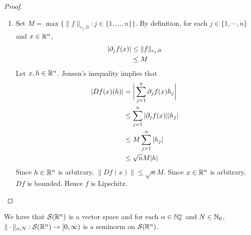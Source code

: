 \documentclass{book}
\begin{document}
	\begin{proof}\
		\begin{enumerate}
			\item Set $M = \max \{\|f\|_{e_j, 0} : j \in \{1, \ldots, n\}\}$. By definition, for each $j \in \{1, \cdots, n\}$ and $x \in \mathbb{R}^n$, 
			\begin{align*}
				| \partial_j f(x)| 
				& \leq \|f\|_{e_j, 0} \\
				& \leq M  
			\end{align*}
			Let $x, h \in \mathbb{R}^n$. Jensen's inequality implies that
			\begin{align*}
				|Df(x)(h)|
				& = \bigg| \sum_{j = 1}^n \partial_jf(x) h_j \bigg| \\
				& \leq \sum_{j = 1}^n |\partial_jf(x)| |h_j| \\
				& \leq M \sum_{j = 1}^n |h_j| \\
				& \leq \sqrt{n} M |h| 
			\end{align*}
			Since $h \in \mathbb{R}^n$ is arbitrary, $\|Df(x)\| \leq \sqrt{n}M$. Since $x \in \mathbb{R}^n$ is arbitrary, $Df$ is bounded. Hence $f$ is Lipschitz.
			
		\end{enumerate}
	\end{proof}

	\begin{ex} 
		We have that $\mathcal{S}(\mathbb{R}^n)$ is a vector space and for each $\alpha \in \mathbb{N}_0^n$ and $N \in  \mathbb{N}_0$,  $\| \cdot \|_{\alpha, N}: \mathcal{S}(\mathbb{R}^n) \rightarrow [0,\infty)$ is a seminorm on $\mathcal{S}(\mathbb{R}^n)$.
	\end{ex}
\end{document}
